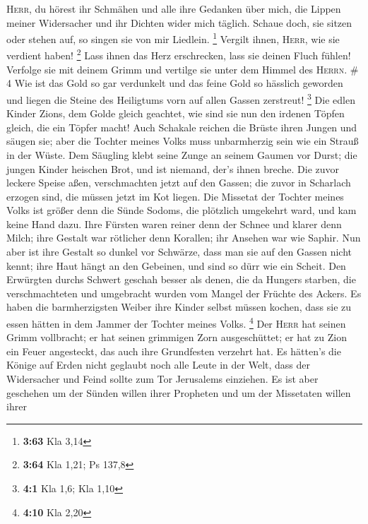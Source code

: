 \textsc{Herr}, du hörest ihr Schmähen und alle ihre Gedanken über mich,
 die Lippen meiner Widersacher und ihr Dichten wider mich
täglich.  Schaue doch, sie sitzen oder stehen auf, so
singen sie von mir Liedlein. \footnote{\textbf{3:63} Kla 3,14}
 Vergilt ihnen, \textsc{Herr}, wie sie verdient haben!
\footnote{\textbf{3:64} Kla 1,21; Ps 137,8}  Lass ihnen
das Herz erschrecken, lass sie deinen Fluch fühlen! 
Verfolge sie mit deinem Grimm und vertilge sie unter dem Himmel des
\textsc{Herrn}. \# 4  Wie ist das Gold so gar verdunkelt
und das feine Gold so hässlich geworden und liegen die Steine des
Heiligtums vorn auf allen Gassen zerstreut! \footnote{\textbf{4:1} Kla
  1,6; Kla 1,10}  Die edlen Kinder Zions, dem Golde gleich
geachtet, wie sind sie nun den irdenen Töpfen gleich, die ein Töpfer
macht!  Auch Schakale reichen die Brüste ihren Jungen und
säugen sie; aber die Tochter meines Volks muss unbarmherzig sein wie ein
Strauß in der Wüste.  Dem Säugling klebt seine Zunge an
seinem Gaumen vor Durst; die jungen Kinder heischen Brot, und ist
niemand, der's ihnen breche.  Die zuvor leckere Speise
aßen, verschmachten jetzt auf den Gassen; die zuvor in Scharlach erzogen
sind, die müssen jetzt im Kot liegen.  Die Missetat der
Tochter meines Volks ist größer denn die Sünde Sodoms, die plötzlich
umgekehrt ward, und kam keine Hand dazu.  Ihre Fürsten
waren reiner denn der Schnee und klarer denn Milch; ihre Gestalt war
rötlicher denn Korallen; ihr Ansehen war wie Saphir.  Nun
aber ist ihre Gestalt so dunkel vor Schwärze, dass man sie auf den
Gassen nicht kennt; ihre Haut hängt an den Gebeinen, und sind so dürr
wie ein Scheit.  Den Erwürgten durchs Schwert geschah
besser als denen, die da Hungers starben, die verschmachteten und
umgebracht wurden vom Mangel der Früchte des Ackers.  Es
haben die barmherzigsten Weiber ihre Kinder selbst müssen kochen, dass
sie zu essen hätten in dem Jammer der Tochter meines Volks. \footnote{\textbf{4:10}
  Kla 2,20}  Der \textsc{Herr} hat seinen Grimm
vollbracht; er hat seinen grimmigen Zorn ausgeschüttet; er hat zu Zion
ein Feuer angesteckt, das auch ihre Grundfesten verzehrt hat.
 Es hätten's die Könige auf Erden nicht geglaubt noch
alle Leute in der Welt, dass der Widersacher und Feind sollte zum Tor
Jerusalems einziehen.  Es ist aber geschehen um der
Sünden willen ihrer Propheten und um der Missetaten willen ihrer
